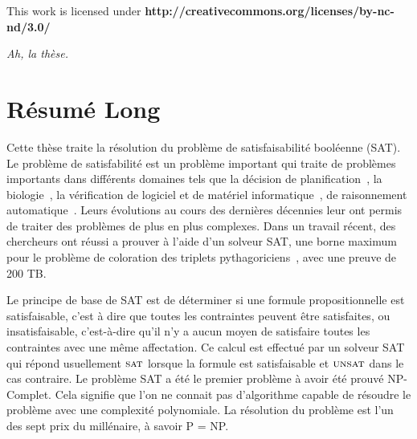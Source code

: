 \clearpage\null\vfill
\thispagestyle{empty}
\begin{minipage}[b]{.9\textwidth}
  \begin{center}
  \setlength{\parskip}{.5\baselineskip}
  {\color{phdcol0}%
   \ccLogo\hspace{.1cm}%
   \ccAttribution\hspace{.1cm}%
   \ccNonCommercial\hspace{.1cm}%
   \ccNoDerivatives}\hspace{.15cm}%
  \footnotesize%
  This work is licensed under {\color{phdcol1}\textbf{http://creativecommons.org/licenses/by-nc-nd/3.0/}}
  \end{center}
\end{minipage}
\vspace*{2\baselineskip}

\clearpage

\thispagestyle{empty}
\begin{flushright}
  \textit{Ah, la thèse.}
\end{flushright}
%
%
%

%
\chapter*{Résumé Long}


Cette thèse traite la résolution du problème de satisfaisabilité booléenne (SAT).
Le problème de satisfabilité est un problème important qui traite de problèmes importants dans différents domaines tels 
que la décision de planification~\cite{planning_92}, la biologie~\cite{biology_06}, la vérification de logiciel et de 
matériel informatique~\cite{biere1999symbolic}, de raisonnement automatique~\cite{heule2016solving}.
Leurs évolutions au cours des dernières décennies leur ont permis de traiter des problèmes de plus en plus complexes.
Dans un travail récent, des chercheurs ont réussi a prouver à l'aide d'un solveur SAT, une borne maximum
pour le problème de coloration des triplets pythagoriciens~\cite{heule2016solving}, avec une preuve de 200 TB.


Le principe de base de SAT est de déterminer si une formule propositionnelle
est satisfaisable, c'est à dire que toutes les contraintes peuvent être satisfaites,
ou insatisfaisable, c'est-à-dire qu'il n'y a aucun moyen de satisfaire toutes les contraintes avec une même affectation.
Ce calcul est effectué par un solveur SAT qui répond usuellement $\textsc{sat}$ lorsque la formule est satisfaisable et $\textsc{unsat}$ dans le cas
contraire. Le problème SAT a été le premier problème à avoir été prouvé NP-Complet. Cela signifie que
l'on ne connait pas d'algorithme capable de résoudre le problème avec une complexité polynomiale.
La résolution du problème est l'un des sept prix du millénaire, à savoir P = NP.


